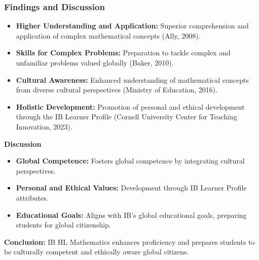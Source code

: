\documentclass{beamer}
\begin{document}
\begin{frame}
  \frametitle{Findings and Discussion}
  \begin{itemize}
      \item \textbf{Higher Understanding and Application:} Superior comprehension and application of complex mathematical concepts (Ally, 2008).
      \item \textbf{Skills for Complex Problems:} Preparation to tackle complex and unfamiliar problems valued globally (Baker, 2010).
      \item \textbf{Cultural Awareness:} Enhanced understanding of mathematical concepts from diverse cultural perspectives (Ministry of Education, 2016).
      \item \textbf{Holistic Development:} Promotion of personal and ethical development through the IB Learner Profile (Cornell University Center for Teaching Innovation, 2023).
  \end{itemize}
  \vspace{0.3cm}
\end{frame}
\begin{frame}
  

  \textbf{Discussion}
  \begin{itemize}
      \item \textbf{Global Competence:} Fosters global competence by integrating cultural perspectives.
      \item \textbf{Personal and Ethical Values:} Development through IB Learner Profile attributes.
      \item \textbf{Educational Goals:} Aligns with IB's global educational goals, preparing students for global citizenship.
  \end{itemize}
  \vspace{0.3cm}
  \textbf{Conclusion:} IB HL Mathematics enhances proficiency and prepares students to be culturally competent and ethically aware global citizens.
\end{frame}
\end{document}

